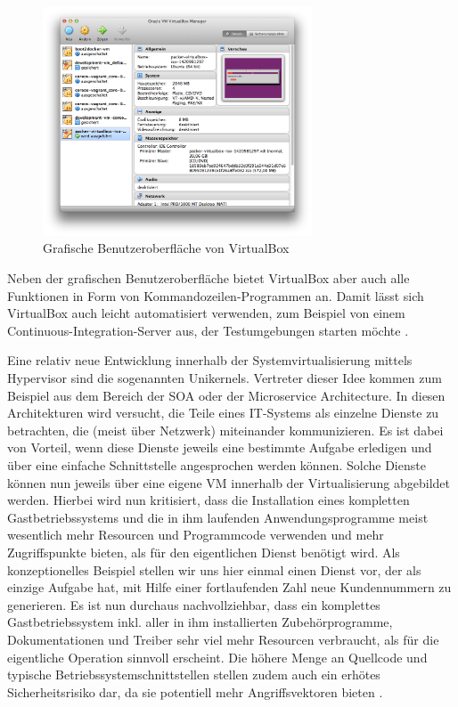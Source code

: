 \begin{figure}[!ht]
  \begin{center}
    \includegraphics[width=8cm]{bilder/virtualbox-gui.png}
    \caption{Grafische Benutzeroberfläche von VirtualBox}
  \end{center}
\end{figure}

Neben der grafischen Benutzeroberfläche bietet VirtualBox aber auch alle Funktionen in Form von Kommandozeilen-Programmen an. Damit lässt sich VirtualBox auch leicht automatisiert verwenden, zum Beispiel von einem Continuous-Integration-Server aus, der Testumgebungen starten möchte \citep[Vgl.][S. 113]{Oracle14}.


Eine relativ neue Entwicklung innerhalb der Systemvirtualisierung mittels Hypervisor sind die sogenannten Unikernels. Vertreter dieser Idee kommen zum Beispiel aus dem Bereich der \ac{SOA} oder der Microservice Architecture. In diesen Architekturen wird versucht, die Teile eines IT-Systems als einzelne Dienste zu betrachten, die (meist über Netzwerk) miteinander kommunizieren. Es ist dabei von Vorteil, wenn diese Dienste jeweils eine bestimmte Aufgabe erledigen und über eine einfache Schnittstelle angesprochen werden können. Solche Dienste können nun jeweils über eine eigene \ac{VM} innerhalb der Virtualisierung abgebildet werden. Hierbei wird nun kritisiert, dass die Installation eines kompletten Gastbetriebssystems und die in ihm laufenden Anwendungsprogramme meist wesentlich mehr Resourcen und Programmcode verwenden und mehr Zugriffspunkte bieten, als für den eigentlichen Dienst benötigt wird. Als konzeptionelles Beispiel stellen wir uns hier einmal einen Dienst vor, der als einzige Aufgabe hat, mit Hilfe einer fortlaufenden Zahl neue Kundennummern zu generieren. Es ist nun durchaus nachvollziehbar, dass ein komplettes Gastbetriebssystem inkl. aller in ihm installierten Zubehörprogramme, Dokumentationen und Treiber sehr viel mehr Resourcen verbraucht, als für die eigentliche Operation sinnvoll erscheint. Die höhere Menge an Quellcode und typische Betriebssystemschnittstellen stellen zudem auch ein erhötes Sicherheitsrisiko dar, da sie potentiell mehr Angriffsvektoren bieten \citep[Vgl.][Abstract und Introduction]{MadMorAnd13}.

